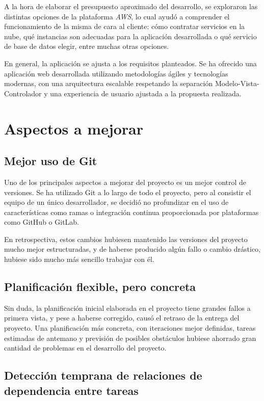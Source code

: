 \documentclass[10pt, a4paper]{aqademic}
\begin{document}
A la hora de elaborar el presupuesto aproximado del desarrollo, se exploraron las distintas opciones de la plataforma \textit{AWS}, lo cual ayudó a comprender el funcionamiento de la misma de cara al cliente: cómo contratar servicios en la nube, qué instancias son adecuadas para la aplicación desarrollada o qué servicio de base de datos elegir, entre muchas otras opciones.

En general, la aplicación se ajusta a los requisitos planteados. Se ha ofrecido una aplicación web desarrollada utilizando metodologías ágiles y tecnologías modernas, con una arquitectura escalable respetando la separación Modelo-Vista-Controlador y una experiencia de usuario ajustada a la propuesta realizada.


\section{Aspectos a mejorar}

\subsection*{Mejor uso de Git}

Uno de los principales aspectos a mejorar del proyecto es un mejor control de versiones. Se ha utilizado Git a lo largo de todo el proyecto, pero al consistir el equipo de un único desarrollador, se decidió no profundizar en el uso de características como ramas o integración continua proporcionada por plataformas como GitHub o GitLab.

En retrospectiva, estos cambios hubiesen mantenido las versiones del proyecto mucho mejor estructuradas, y de haberse producido algún fallo o cambio drástico, hubiese sido mucho más sencillo trabajar con él.


\subsection*{Planificación flexible, pero concreta}

Sin duda, la planificación inicial elaborada en el proyecto tiene grandes fallos a primera vista, y pese a haberse corregido, causó el retraso de la entrega del proyecto.
Una planificación más concreta, con iteraciones mejor definidas, tareas estimadas de antemano y previsión de posibles obstáculos hubiese ahorrado gran cantidad de problemas en el desarrollo del proyecto.


\subsection*{Detección temprana de relaciones de dependencia entre tareas}
\end{document}
